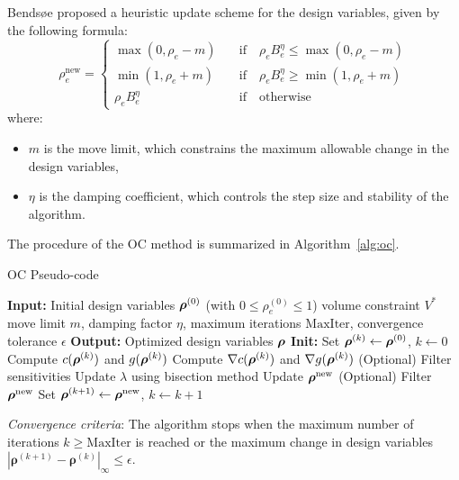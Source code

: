\documentclass[mathpazo]{cicp}
\begin{document}
Bendsøe \cite{bendsoe1995optimization} proposed a heuristic update scheme for the design variables, given by the following formula:
\begin{equation*}
	\rho_e^{\mathrm{new}}=
	\begin{cases}
		\max(0,\rho_e-m)\quad&\text{if}\quad \rho_eB_e^\eta\leq\max(0,\rho_e-m)\\
		\min(1,\rho_e+m)\quad&\text{if}\quad\rho_eB_e^\eta \geq \min(1,\rho_e+m)\\
		\rho_eB_e^\eta\quad&\text{if}\quad\text{otherwise}
	\end{cases}
\end{equation*}
where: 
\begin{itemize} 
	\item $m$ is the move limit, which constrains the maximum allowable change in the design variables,
	\item $\eta$ is the damping coefficient, which controls the step size and stability of the algorithm. 
\end{itemize}

The procedure of the OC method is summarized in Algorithm~\ref{alg:oc}.
\begin{FloatAlgo}{OC Pseudo-code}\label{alg:oc}
	\begin{algorithmic}[1]
		\STATE \textbf{Input:} 
		\STATE Initial design variables $\boldsymbol{\rho}^{(0)}$ (with $0 \leq \rho_e^{(0)} \leq 1$)
		\STATE volume constraint $V^*$
		\STATE move limit $m$, damping factor $\eta$, maximum iterations $\mathrm{MaxIter}$, convergence tolerance $\epsilon$
		\STATE \textbf{Output:} Optimized design variables $\boldsymbol{\rho}$
		\STATE \textbf{Init:} Set $\boldsymbol{\rho}^{(k)} \leftarrow \boldsymbol{\rho}^{(0)}$, $k \leftarrow 0$
		\STATE Compute $c(\boldsymbol{\rho}^{(k)})$ and $g(\boldsymbol{\rho}^{(k)})$
		\STATE Compute $\nabla c(\boldsymbol{\rho}^{(k)})$ and $\nabla g(\boldsymbol{\rho}^{(k)})$
		\STATE (Optional) Filter sensitivities
		\STATE Update $\lambda$ using bisection method
		\STATE Update $\boldsymbol{\rho}^{\text{new}}$
		\STATE (Optional) Filter $\boldsymbol{\rho}^{\text{new}}$
		\STATE Set $\boldsymbol{\rho}^{(k+1)} \leftarrow \boldsymbol{\rho}^{\text{new}}$, $k \leftarrow k + 1$
		\ENDWHILE
	\end{algorithmic}
	\smallskip
	\textit{Convergence criteria}: The algorithm stops when the maximum number of iterations $k \geq \mathrm{MaxIter}$ is reached or the maximum change in design variables $|\boldsymbol{\rho}^{(k+1)} - \boldsymbol{\rho}^{(k)}|_\infty \leq \epsilon$.
\end{FloatAlgo}
\end{document}

